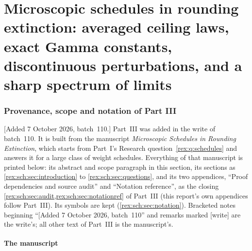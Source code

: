 \part{Microscopic schedules in rounding extinction: averaged ceiling laws, exact Gamma constants, discontinuous perturbations, and a sharp spectrum of limits}
\label{rex:sch:part}

\section{Provenance, scope and notation of Part III}\label{rex:sch:sec:front}

[Added 7 October 2026, batch~110.] Part~III was added in the write of
batch~110. It is built from the manuscript \emph{Microscopic Schedules in
Rounding Extinction}, which starts from Part~I's Research
question~\ref{rex:q:schedules} and answers it for a large class of weight
schedules. Everything of that manuscript is printed below: its abstract
and scope paragraph in this section, its sections as
\cref{rex:sch:sec:introduction} to \cref{rex:sch:sec:questions}, and its
two appendices, ``Proof dependencies and source audit'' and ``Notation
reference'', as the closing \cref{rex:sch:sec:audit,rex:sch:sec:notationref}
of Part~III (this report's own appendices follow Part~III). Its symbols are
kept (\cref{rex:sch:sec:notation}). Bracketed notes beginning ``[Added
7 October 2026, batch~110'' and remarks marked \textsf{[write]} are the
write's; all other text of Part~III is the manuscript's.

\subsection{The manuscript}\label{rex:sch:sec:provenance}

